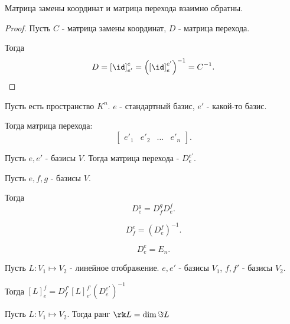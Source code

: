 \begin{statement} \thmslashn

    Матрица замены координат и матрица перехода взаимно обратны.
    \begin{proof} \thmslashn
    
        Пусть $C$ - матрица замены координат, $D$ - матрица перехода.

        Тогда
        \[ D = \left[\id\right]_{e'}^{e} = \left( \left[\id\right]_{e}^{e'} \right)^{-1} = C^{-1}  .\] 
    \end{proof}
\end{statement}
\begin{example} \thmslashn

    Пусть есть пространство $K^{n}$. $e$ - стандартный базис, $e'$ - какой-то базис.

    Тогда матрица перехода:
    \[ \begin{bmatrix} e'_{1} & e'_{2} & \ldots & e'_{n} \end{bmatrix}  .\] 
\end{example}
\begin{remark} \thmslashn

    Пусть $e, e'$ - базисы $V$. Тогда матрица перехода - $D_{e}^{e'}$.
\end{remark}
\begin{properties} \thmslashn

    Пусть $e, f, g$ - базисы $V$.

    Тогда
    \[ D_{e}^{g} = D_{f}^{g}D_{e}^{f} .\]

    \[ D_{f}^{e} = (D_{e}^{f})^{-1} .\]

    \[ D_{e}^{e} = E_{n} .\] 
\end{properties}
\begin{theorem} \thmslashn

    Пусть $L : V_1 \mapsto V_2$ - линейное отображение. $e, e'$ - базисы $V_1$, $f, f'$ - базисы $V_2$.

    Тогда $[L]_{e}^{f} = D_{f}^{f'}\left[L\right]_{e'}^{f'}\left(D_{e}^{e'}\right)^{-1}$
\end{theorem}
\begin{definition} \thmslashn 

Пусть $L : V_1 \mapsto V_2$. Тогда ранг $\rk L = \dim \Im L$
\end{definition}

